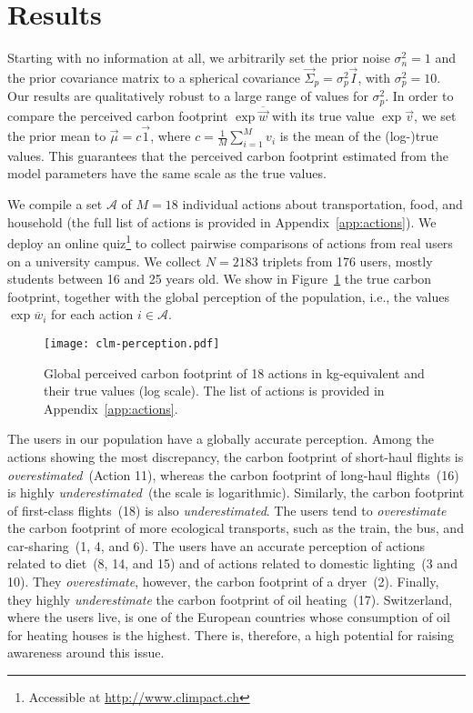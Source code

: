 \section{Results}
\label{sec:results}

Starting with no information at all, we arbitrarily set the prior noise $\sigma_n^{2} = 1$ and the prior covariance matrix to a spherical covariance $\vec{\Sigma}_p = \sigma_p^{2} \vec{I}$, with $\sigma_p^{2} = 10$.
Our results are qualitatively robust to a large range of values for $\sigma_p^{2}$.
In order to compare the perceived carbon footprint $\exp \overline{\vec{w}}$ with its true value $\exp \vec{v}$, we set the prior mean to $\vec{\mu} = c \vec{1}$, where $ c = \frac{1}{M}\sum_{i=1}^M v_i$ is the mean of the (log-)true values.
This guarantees that the perceived carbon footprint estimated from the model parameters have the same scale as the true values.

We compile a set $\mathcal{A}$ of $M=18$ individual actions about transportation, food, and household (the full list of actions is provided in Appendix~\ref{app:actions}).
We deploy an online quiz\footnote{Accessible at \url{http://www.climpact.ch}} to collect pairwise comparisons of actions from real users on a university campus.
We collect $N=2183$ triplets from 176 users, mostly students between 16 and 25 years old.
We show in Figure~\ref{fig:perception} the true carbon footprint, together with the global perception of the population, i.e., the values $\exp \overline{w}_i$ for each action $i \in \mathcal{A}$.

\begin{figure}
	\centering
	\texttt{[image: clm-perception.pdf]}
	\caption{Global perceived carbon footprint of 18 actions in kg\COtwo-equivalent and their true values (log scale).
		The list of actions is provided in Appendix~\ref{app:actions}.}%
	\label{fig:perception}
\end{figure}

The users in our population have a globally accurate perception.
Among the actions showing the most discrepancy, the carbon footprint of short-haul flights is \textit{overestimated}~(Action 11), whereas the carbon footprint of long-haul flights~(16) is highly \textit{underestimated}~(the scale is logarithmic).
Similarly, the carbon footprint of first-class flights~(18) is also \textit{underestimated}.
The users tend to \textit{overestimate} the carbon footprint of more ecological transports, such as the train, the bus, and car-sharing~(1, 4, and 6).
The users have an accurate perception of actions related to diet~(8, 14, and 15) and of actions related to domestic lighting~(3 and 10).
They \textit{overestimate}, however, the carbon footprint of a dryer~(2).
Finally, they highly \textit{underestimate} the carbon footprint of oil heating~(17).
Switzerland, where the users live, is one of the European countries whose consumption of oil for heating houses is the highest.
There is, therefore, a high potential for raising awareness around this issue.
